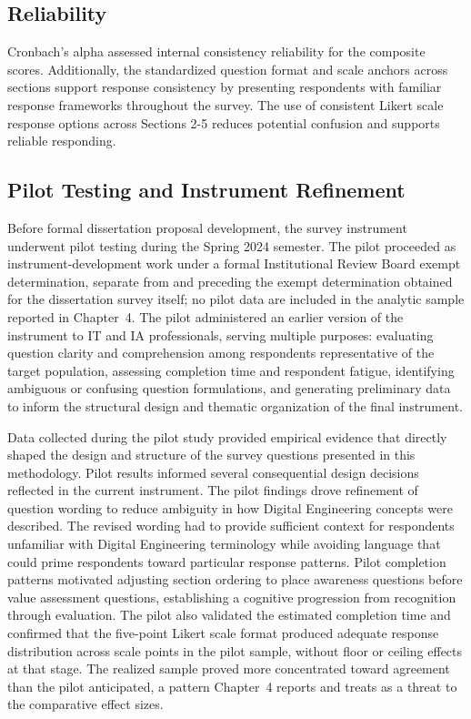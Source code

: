 \subsection{Reliability}

Cronbach's alpha assessed internal consistency reliability for the composite scores. Additionally, the standardized question format and scale anchors across sections support response consistency by presenting respondents with familiar response frameworks throughout the survey. The use of consistent Likert scale response options across Sections 2-5 reduces potential confusion and supports reliable responding.

\subsection{Pilot Testing and Instrument Refinement}

Before formal dissertation proposal development, the survey instrument underwent pilot testing during the Spring 2024 semester. The pilot proceeded as instrument-development work under a formal Institutional Review Board exempt determination, separate from and preceding the exempt determination obtained for the dissertation survey itself; no pilot data are included in the analytic sample reported in Chapter~4. %
The pilot administered an earlier version of the instrument to IT and IA professionals, serving multiple purposes: evaluating question clarity and comprehension among respondents representative of the target population, assessing completion time and respondent fatigue, identifying ambiguous or confusing question formulations, and generating preliminary data to inform the structural design and thematic organization of the final instrument.

Data collected during the pilot study provided empirical evidence that directly shaped the design and structure of the survey questions presented in this methodology. Pilot results informed several consequential design decisions reflected in the current instrument. The pilot findings drove refinement of question wording to reduce ambiguity in how Digital Engineering concepts were described. The revised wording had to provide sufficient context for respondents unfamiliar with Digital Engineering terminology while avoiding language that could prime respondents toward particular response patterns. Pilot completion patterns motivated adjusting section ordering to place awareness questions before value assessment questions, establishing a cognitive progression from recognition through evaluation. The pilot also validated the estimated completion time and confirmed that the five-point Likert scale format produced adequate response distribution across scale points in the pilot sample, without floor or ceiling effects at that stage. The realized sample proved more concentrated toward agreement than the pilot anticipated, a pattern Chapter~4 reports and treats as a threat to the comparative effect sizes.

